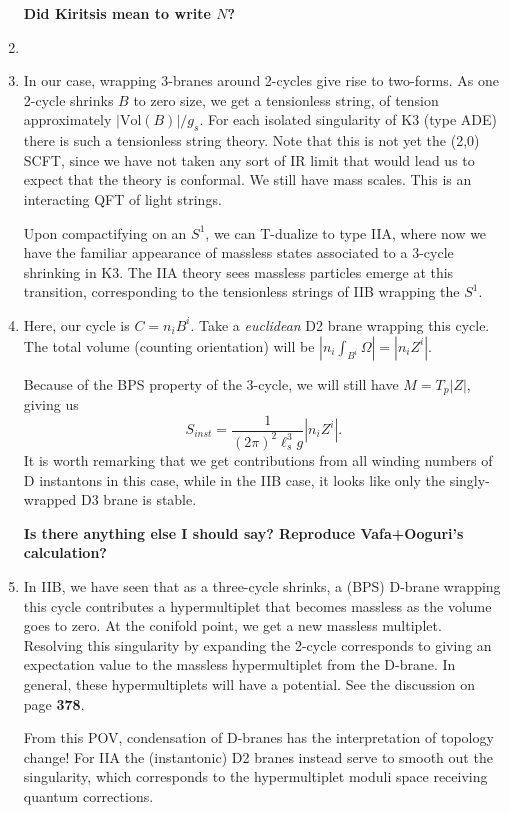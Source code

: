 \documentclass[11pt, class=article, crop=false]{standalone}
\begin{document}
\begin{enumerate}
	\textbf{Did Kiritsis mean to write $N$?}
	

	\item 
	
	\item In our case, wrapping 3-branes around 2-cycles give rise to two-forms. As one 2-cycle shrinks $B$ to zero size, we get a tensionless string, of tension approximately $|\text{Vol}(B)|/g_s$. For each isolated singularity of K3 (type ADE) there is such a tensionless string theory. Note that this is not yet the (2,0) SCFT, since we have not taken any sort of IR limit that would lead us to expect that the theory is conformal. We still have mass scales. This is an interacting QFT of light strings. 
	
	Upon compactifying on an $S^1$, we can T-dualize to type IIA, where now we have the familiar appearance of massless states associated to a 3-cycle shrinking in K3. The IIA theory sees massless particles emerge at this transition, corresponding to the tensionless strings of IIB wrapping the $S^1$.
	
	\item Here, our cycle is $C = n_i B^i$. Take a \emph{euclidean} D2 brane wrapping this cycle. The total volume (counting orientation) will be $|n_i \int_{B^i} \Omega| = |n_i Z^i|$. 
	
	Because of the BPS property of the 3-cycle, we will still have $M = T_p |Z|$, giving us
	\[
		S_{inst} = \frac{1}{(2\pi)^2 \ell_s^3 g} |n_i Z^i|.
	\]
	It is worth remarking that we get contributions from all winding numbers of D instantons in this case, while in the IIB case, it looks like only the singly-wrapped D3 brane is stable.
	
	\textbf{Is there anything else I should say? Reproduce Vafa+Ooguri's calculation?}
	
	\item In IIB, we have seen that as a three-cycle shrinks, a (BPS) D-brane wrapping this cycle contributes a hypermultiplet that becomes massless as the volume goes to zero. At the conifold point, we get a new massless multiplet. Resolving this singularity by expanding the 2-cycle corresponds to giving an expectation value to the massless hypermultiplet from the D-brane. In general, these hypermultiplets will have a potential. See the discussion on page \textbf{378}.
	
	From this POV, condensation of D-branes has the interpretation of topology change! For IIA the (instantonic) D2 branes instead serve to smooth out the singularity, which corresponds to the hypermultiplet moduli space receiving quantum corrections. 
	

\end{enumerate}
\end{document}
